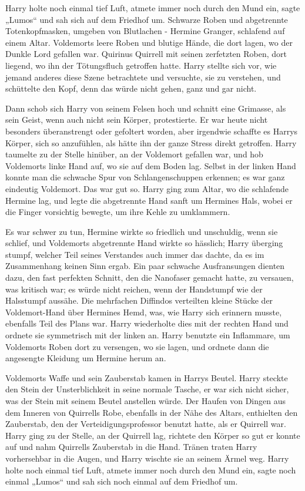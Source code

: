 {Harry holte noch einmal tief Luft, atmete immer noch durch den Mund ein, sagte\\ „Lumos“ und sah sich auf dem Friedhof um. Schwarze Roben und abgetrennte Totenkopfmasken, umgeben von Blutlachen - Hermine Granger, schlafend auf einem Altar. Voldemorts leere Roben und blutige Hände, die dort lagen, wo der Dunkle Lord gefallen war. Quirinus Quirrell mit seinen zerfetzten Roben, dort liegend, wo ihn der Tötungsfluch getroffen hatte. Harry stellte sich vor, wie jemand anderes diese Szene betrachtete und versuchte, sie zu verstehen, und schüttelte den Kopf, denn das würde nicht gehen, ganz und gar nicht.

Dann schob sich Harry von seinem Felsen hoch und schnitt eine Grimasse, als sein Geist, wenn auch nicht sein Körper, protestierte. Er war heute nicht besonders überanstrengt oder gefoltert worden, aber irgendwie schaffte es Harrys Körper, sich so anzufühlen, als hätte ihn der ganze Stress direkt getroffen. Harry taumelte zu der Stelle hinüber, an der Voldemort gefallen war, und hob Voldemorts linke Hand auf, wo sie auf dem Boden lag. Selbst in der linken Hand konnte man die schwache Spur von Schlangenschuppen erkennen; es war ganz eindeutig Voldemort. Das war gut so. Harry ging zum Altar, wo die schlafende Hermine lag, und legte die abgetrennte Hand sanft um Hermines Hals, wobei er die Finger vorsichtig bewegte, um ihre Kehle zu umklammern.

Es war schwer zu tun, Hermine wirkte so friedlich und unschuldig, wenn sie schlief, und Voldemorts abgetrennte Hand wirkte so hässlich; Harry überging stumpf, welcher Teil seines Verstandes auch immer das dachte, da es im Zusammenhang keinen Sinn ergab. Ein paar schwache Ausfransungen dienten dazu, den fast perfekten Schnitt, den die Nanofaser gemacht hatte, zu versauen, was kritisch war; es würde nicht reichen, wenn der Handstumpf wie der Halsstumpf aussähe. Die mehrfachen Diffindos verteilten kleine Stücke der Voldemort-Hand über Hermines Hemd, was, wie Harry sich erinnern musste, ebenfalls Teil des Plans war. Harry wiederholte dies mit der rechten Hand und ordnete sie symmetrisch mit der linken an. Harry benutzte ein Inflammare, um Voldemorts Roben dort zu versengen, wo sie lagen, und ordnete dann die angesengte Kleidung um Hermine herum an.

Voldemorts Waffe und sein Zauberstab kamen in Harrys Beutel. Harry steckte den Stein der Unsterblichkeit in seine normale Tasche, er war sich nicht sicher, was der Stein mit seinem Beutel anstellen würde. Der Haufen von Dingen aus dem Inneren von Quirrells Robe, ebenfalls in der Nähe des Altars, enthielten den Zauberstab, den der Verteidigungsprofessor benutzt hatte, als er Quirrell war. Harry ging zu der Stelle, an der Quirrell lag, richtete den Körper so gut er konnte auf und nahm Quirrells Zauberstab in die Hand. Tränen traten Harry vorhersehbar in die Augen, und Harry wischte sie an seinem Ärmel weg. Harry holte noch einmal tief Luft, atmete immer noch durch den Mund ein, sagte noch einmal „Lumos“ und sah sich noch einmal auf dem Friedhof um.

}

